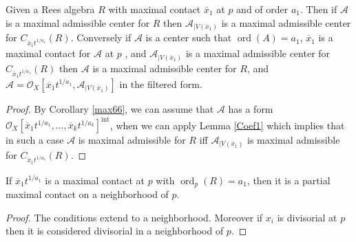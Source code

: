 \documentclass{amsart}
\newcommand{\cA}{{\mathcal A}}
\newcommand{\cO}{{\mathcal O}}
\newcommand{\Int}{{\operatorname{Int}}}
\newcommand{\ord}{{\operatorname{ord}}}
\newcommand{\inte}{{\operatorname{int}}}
\begin{document}
\begin{proposition} \label{max666}    Given a Rees algebra $R$ with maximal contact $\overline{x}_1$ at $p$ and of order  $a_1$. Then if $\cA$ is a maximal admissible center for $R$ then $\cA_{|V(\overline{x}_1)}$ is a maximal admissible center for $C_{\overline{x}_1t^{1/a_1}}(R)$. Conversely if  $\cA$ is a center such that $\ord(A)=a_1$, $ \overline{x}_1$  is a maximal contact for $\cA$ at $p$ , and
$\cA_{|V(\overline{x}_1)}$ is a maximal admissible center for $C_{\overline{x}_1t^{1/a_1}}(R)$ then  $\cA$ is a maximal admissible center for $R$, and $\cA=\cO_X[\overline{x}_1t^{1/a_1},\cA_{|V(\overline{x}_1)}]$ in the filtered form.


\end{proposition}
\begin{proof}  By Corollary \ref{max66},  we can assume that  $\cA$ has a form $\cO_X[\overline{x}_1 t^{1/a_1}, \ldots, \overline{x}_k t^{1/a_k}]^\inte$, when we can apply Lemma \ref{Coef1} which implies that in such a case $\cA$ is maximal admissible for $R$ iff $\cA_{|V(\overline{x}_1)}$  is maximal admissible for $C_{\overline{x}_1t^{1/a_1}}(R)$.

\end{proof}

\begin{lemma} \label{partial}
If $\overline{x}_1 t^{1/a_1}$ is a maximal contact at $p$ with $\ord_p(R) = a_1$, then it is a partial maximal contact on a neighborhood of $p$. 
\end{lemma}
\begin{proof} The conditions extend to a neighborhood. Moreover if $x_i$ is divisorial at $p$ then it is considered divisorial in a neighborhood of $p$.
\end{proof}
\end{document}
